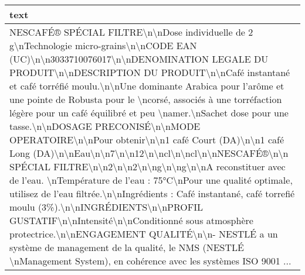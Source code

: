 \begin{tabular}{l}
\toprule
                                                                                                                                                                                                                                                                                                                                                                                                                                                                                                                                                                                                                                                                                                                                                                                                                                                                                                                                                                                                                                    text \\
\midrule
 NESCAFÉ® SPÉCIAL FILTRE\textbackslash n\textbackslash nDose individuelle de 2 g\textbackslash nTechnologie micro-grains\textbackslash n\textbackslash nCODE EAN (UC)\textbackslash n\textbackslash n3033710076017\textbackslash n\textbackslash nDENOMINATION LEGALE DU PRODUIT\textbackslash n\textbackslash nDESCRIPTION DU PRODUIT\textbackslash n\textbackslash nCafé instantané et café torréfié moulu.\textbackslash n\textbackslash nUne dominante Arabica pour l'arôme et une pointe de Robusta pour le \textbackslash ncorsé, associés à une torréfaction légère pour un café équilibré et peu \textbackslash namer.\textbackslash nSachet dose pour une tasse.\textbackslash n\textbackslash nDOSAGE PRECONISÉ\textbackslash n\textbackslash nMODE OPERATOIRE\textbackslash n\textbackslash nPour obtenir\textbackslash n\textbackslash n1 café Court (DA)\textbackslash n\textbackslash n1 café Long (DA)\textbackslash n\textbackslash nEau\textbackslash n\textbackslash n7\textbackslash n\textbackslash n12\textbackslash n\textbackslash ncl\textbackslash n\textbackslash ncl\textbackslash n\textbackslash nNESCAFÉ®\textbackslash n\textbackslash n SPÉCIAL FILTRE\textbackslash n\textbackslash n2\textbackslash n\textbackslash n2\textbackslash n\textbackslash ng\textbackslash n\textbackslash ng\textbackslash n\textbackslash nA reconstituer avec de l'eau. \textbackslash nTempérature de l'eau : 75°C\textbackslash nPour une qualité optimale, utilisez de l'eau filtrée.\textbackslash n\textbackslash nIngrédients : Café instantané, café torrefié moulu (3\%).\textbackslash n\textbackslash nINGRÉDIENTS\textbackslash n\textbackslash nPROFIL GUSTATIF\textbackslash n\textbackslash nIntensité\textbackslash n\textbackslash nConditionné sous atmosphère protectrice.\textbackslash n\textbackslash nENGAGEMENT QUALITÉ\textbackslash n\textbackslash n- NESTLÉ a un système de management de la qualité, le NMS (NESTLÉ \textbackslash nManagement System), en cohérence avec les systèmes ISO 9001 ... \\

\end{tabular}

